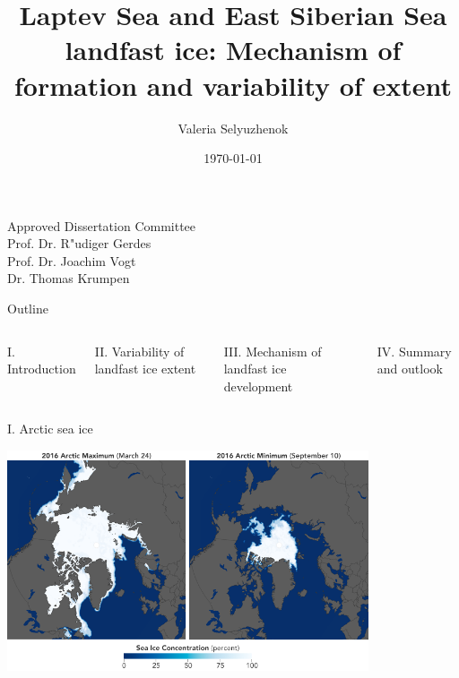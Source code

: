 \documentclass[8pt]{beamer}
\title{Laptev Sea and East Siberian Sea landfast ice: Mechanism of formation and variability of extent}
\date{\today}
\author{Valeria Selyuzhenok}
\institute{Jacobs University Bremen}
\begin{document}
\maketitle
{}
\begin{flushright}
		\textsf {Approved Dissertation Committee}\\[0.4cm]	
		\textsf{Prof. Dr. R"udiger Gerdes}\\ 
		\textsf{Prof. Dr. Joachim Vogt}\\ 	
		\textsf{Dr. Thomas Krumpen}\\ 
\end{flushright}
	
\setwatermark{\fontsize{125pt}{125pt}\selectfont{}}
\begin{frame}{Outline}
	\begin{columns}
		\begin{block}{I. Introduction}
		\end{block}
		\begin{block}{II. Variability of landfast ice extent}
		\end{block}
		\begin{block}{III. Mechanism of landfast ice development}
		\end{block}
		\begin{block}{IV. Summary and outlook} 
		\end{block}
	\end{columns}
\end{frame}

\setwatermark{\fontsize{125pt}{125pt}\selectfont{}}
\begin{frame}[fragile]{I. Arctic sea ice}
	\begin{center}
	\includegraphics[width=0.8\textwidth]{./img/arctic_min_max_map.png}
	\end{center}
\end{frame}
	
\end{document}
